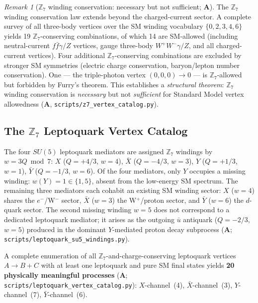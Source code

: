 \documentclass[11pt]{article}
\theoremstyle{remark}
\newtheorem{remark}[theorem]{Remark}
\newcommand{\CatA}{\textbf{A}}
\begin{document}
\begin{remark}[$\mathbb{Z}_7$ winding conservation: necessary but not sufficient; $\CatA$]
\label{rem:z7_necessary_not_sufficient}
The $\mathbb{Z}_7$ winding conservation law extends beyond the charged-current sector.
A complete survey of all three-body vertices over the SM winding vocabulary
$\{0, 2, 3, 4, 6\}$ yields 19 $\mathbb{Z}_7$-conserving combinations, of which
14 are SM-allowed (including neutral-current $f\bar{f}\gamma/Z$ vertices,
gauge three-body $W^+W^-\gamma/Z$, and all charged-current vertices).
Four additional $\mathbb{Z}_7$-conserving combinations are excluded by stronger SM
symmetries (electric charge conservation, baryon/lepton number conservation).
One --- the triple-photon vertex $(0,0,0)\to 0$ --- is $\mathbb{Z}_7$-allowed but
forbidden by Furry's theorem.
This establishes a \emph{structural theorem}: $\mathbb{Z}_7$ winding conservation is
\emph{necessary} but not \emph{sufficient} for Standard Model vertex allowedness
($\CatA$, \texttt{scripts/z7\_vertex\_catalog.py}).
\end{remark}

\subsection{The \texorpdfstring{$\mathbb{Z}_7$}{Z7} Leptoquark Vertex Catalog}
\label{sec:leptoquark_catalog}

The four $SU(5)$ leptoquark mediators are assigned $\mathbb{Z}_7$ windings by
$w = 3Q \bmod 7$:
$X$ ($Q=+4/3$, $w=4$), $\bar X$ ($Q=-4/3$, $w=3$),
$Y$ ($Q=+1/3$, $w=1$), $\bar Y$ ($Q=-1/3$, $w=6$).
Of the four mediators, only $Y$ occupies a missing winding:
$w(Y)=1 \in \{1,5\}$, absent from the low-energy SM spectrum.
The remaining three mediators each cohabit an existing SM winding sector:
$X$ ($w=4$) shares the $e^-$/W$^-$ sector, $\bar X$ ($w=3$) the W$^+$/proton sector,
and $\bar Y$ ($w=6$) the $d$-quark sector.
The second missing winding $w=5$ does not correspond to a dedicated leptoquark mediator;
it arises as the outgoing $\bar u$ antiquark ($Q=-2/3$, $w=5$) produced in the dominant
$Y$-mediated proton decay subprocess (\CatA; \texttt{scripts/leptoquark\_su5\_windings.py}).

A complete enumeration of all $\mathbb{Z}_7$-and-charge-conserving leptoquark
vertices $A \to B+C$ with at least one leptoquark and pure SM final states
yields \textbf{20 physically meaningful processes}
(\CatA; \texttt{scripts/leptoquark\_vertex\_catalog.py}):
$X$-channel~(4), $\bar X$-channel~(3), $Y$-channel~(7), $\bar Y$-channel~(6).
\end{document}
